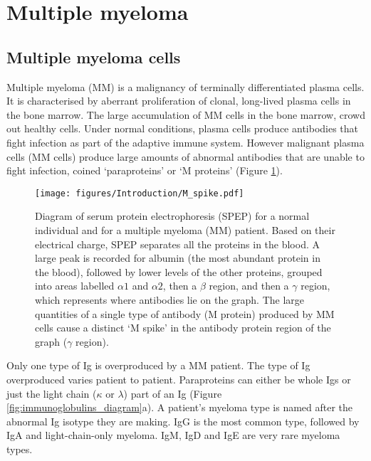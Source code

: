 \section{Multiple myeloma}\label{sec:MM}
\subsection{Multiple myeloma cells}
Multiple myeloma (MM) is a malignancy of terminally differentiated plasma cells.
It is characterised by aberrant proliferation of clonal, long-lived plasma cells in the bone marrow\cite{anderson2011pathogenesis}.
The large accumulation of MM cells in the bone marrow, crowd out healthy cells.
Under normal conditions, plasma cells produce antibodies that fight infection as part of the adaptive immune system.
However malignant plasma cells (MM cells) produce large amounts of abnormal antibodies that are unable to fight infection, coined `paraproteins' or `M proteins' (Figure \ref{fig:m_spike}).
%
\begin{figure}[htb]
\centering
\texttt{[image: figures/Introduction/M\_spike.pdf]}
\caption[M spike diagram]{Diagram of serum protein electrophoresis (SPEP) for a normal individual and for a multiple myeloma (MM) patient.
Based on their electrical charge, SPEP separates all the proteins in the blood.
A large peak is recorded for albumin (the most abundant protein in the blood), followed by lower levels of the other proteins, grouped into areas labelled $\alpha1$ and $\alpha2$, then a $\beta$ region, and then a $\gamma$ region, which represents where antibodies lie on the graph.
The large quantities of a single type of antibody (M protein) produced by MM cells cause a distinct `M spike' in the antibody protein region of the graph ($\gamma$ region).}
\label{fig:m_spike}
\end{figure}
Only one type of Ig is overproduced by a MM patient.
The type of Ig overproduced varies patient to patient.
Paraproteins can either be whole Igs or just the light chain ($\kappa$ or $\lambda$) part of an Ig (Figure \ref{fig:immunoglobulins_diagram}a).
A patient's myeloma type is named after the abnormal Ig isotype they are making.
IgG is the most common type, followed by IgA and light-chain-only myeloma.
IgM, IgD and IgE are very rare myeloma types\cite{cancerresearchuktypes}.

